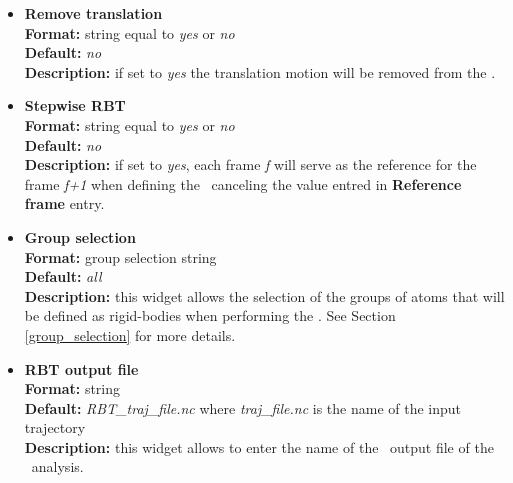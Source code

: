 \documentclass[a4paper,11pt]{report}
\begin{document}
\begin{itemize}
\item \textbf{Remove translation}\\
\textbf{Format:} string equal to \textit{yes} or \textit{no}\\
\textbf{Default:} \textit{no}\\
\textbf{Description:} if set to \textit{yes} the translation motion will be removed from the \RBT .

\item \textbf{Stepwise RBT}\\
\textbf{Format:} string equal to \textit{yes} or \textit{no}\\
\textbf{Default:} \textit{no}\\
\textbf{Description:} if set to \textit{yes}, each frame \textit{f} will serve as the reference for the frame \textit{f+1} 
when defining the \RBT\ canceling the value entred in \textbf{Reference frame} entry.

\item \textbf{Group selection}\\
\textbf{Format:} group selection string\\
\textbf{Default:} \textit{all}\\
\textbf{Description:} this widget allows the selection of the groups of atoms that will be defined as rigid-bodies when performing 
the \RBT . See Section \ref{group_selection} for more details.

\item \textbf{RBT output file}\\
\textbf{Format:} string\\
\textbf{Default:} \textit{RBT\_traj\_file.nc} where \textit{traj\_file.nc} is the name of the input trajectory\\
\textbf{Description:} this widget allows to enter the name of the \NetCDF\ output file of the \RBT\ analysis.
\end{itemize}
\end{document}

